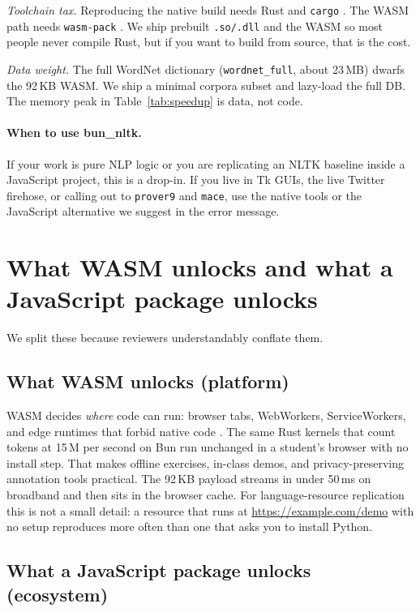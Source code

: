 \documentclass[smallextended]{svjour3}
\begin{document}
\emph{Toolchain tax.} Reproducing the native build needs Rust and \texttt{cargo} \cite{rust2024}. The WASM path needs \texttt{wasm-pack} \cite{wasmPack2024}. We ship prebuilt \texttt{.so/.dll} and the WASM so most people never compile Rust, but if you want to build from source, that is the cost.

\emph{Data weight.} The full WordNet dictionary (\texttt{wordnet\_full}, about 23\,MB) dwarfs the 92\,KB WASM. We ship a minimal corpora subset and lazy-load the full DB. The memory peak in Table~\ref{tab:speedup} is data, not code.

\paragraph{When to use bun\_nltk.}
If your work is pure NLP logic or you are replicating an NLTK baseline inside a JavaScript project, this is a drop-in. If you live in Tk GUIs, the live Twitter firehose, or calling out to \texttt{prover9} and \texttt{mace}, use the native tools or the JavaScript alternative we suggest in the error message.

\section{What WASM unlocks and what a JavaScript package unlocks}
\label{sec:unlocks}

We split these because reviewers understandably conflate them.

\subsection{What WASM unlocks (platform)}

WASM decides \emph{where} code can run: browser tabs, WebWorkers, ServiceWorkers, and edge runtimes that forbid native code \cite{wasm2023,cloudflare2024}. The same Rust kernels that count tokens at 15\,M per second on Bun run unchanged in a student's browser with no install step. That makes offline exercises, in-class demos, and privacy-preserving annotation tools practical. The 92\,KB payload streams in under 50\,ms on broadband and then sits in the browser cache. For language-resource replication this is not a small detail: a resource that runs at \url{https://example.com/demo} with no setup reproduces more often than one that asks you to install Python.

\subsection{What a JavaScript package unlocks (ecosystem)}
\end{document}
